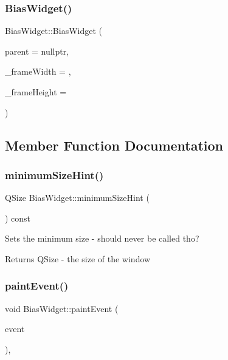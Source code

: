 \subsubsection{\texorpdfstring{Bias\+Widget()}{BiasWidget()}}
{\footnotesize\ttfamily Bias\+Widget\+::\+Bias\+Widget (\begin{DoxyParamCaption}\item[{Q\+Widget $\ast$}]{parent = {\ttfamily nullptr},  }\item[{int}]{\+\_\+frame\+Width = {},  }\item[{int}]{\+\_\+frame\+Height = {} }\end{DoxyParamCaption})\hspace{0.3cm}{\ttfamily [explicit]}}



\subsection{Member Function Documentation}
\mbox{\label{class_bias_widget_a056c7fb68421608c0f163eedad8f3ef1}} 
\subsubsection{\texorpdfstring{minimum\+Size\+Hint()}{minimumSizeHint()}}
{\footnotesize\ttfamily Q\+Size Bias\+Widget\+::minimum\+Size\+Hint (\begin{DoxyParamCaption}{ }\end{DoxyParamCaption}) const\hspace{0.3cm}{\ttfamily [override]}}

Sets the minimum size -\/ should never be called tho? \begin{DoxyReturn}{Returns}
Q\+Size -\/ the size of the window 
\end{DoxyReturn}
\mbox{\label{class_bias_widget_a59937e37b7ba432d0f344f6b211e28af}} 
\subsubsection{\texorpdfstring{paint\+Event()}{paintEvent()}}
{\footnotesize\ttfamily void Bias\+Widget\+::paint\+Event (\begin{DoxyParamCaption}\item[{Q\+Paint\+Event $\ast$}]{event }\end{DoxyParamCaption})\hspace{0.3cm}{\ttfamily [override]}, {\ttfamily [protected]}}


